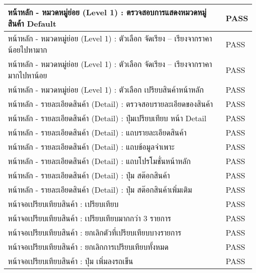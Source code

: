\begin{longtable}{|l|l|}
    \hline
    หน้าหลัก - หมวดหมู่ย่อย (Level 1) : ตรวจสอบการแสดงหมวดหมู่สินค้า Default                 & PASS             \\ 
    \hline
    หน้าหลัก - หมวดหมู่ย่อย (Level 1) : ตัวเลือก จัดเรียง – เรียงจากราคาน้อยไปหามาก          & PASS             \\ 
    \hline
    หน้าหลัก - หมวดหมู่ย่อย (Level 1) : ตัวเลือก จัดเรียง – เรียงจากราคามากไปหาน้อย          & PASS             \\ 
    \hline
    หน้าหลัก - หมวดหมู่ย่อย (Level 1) : ตัวเลือก เปรียบสินค้าหน้าหลัก                        & PASS             \\ 
    \hline
    หน้าหลัก - รายละเอียดสินค้า (Detail) : ตรวจสอบรายละเอียดของสินค้า                        & PASS             \\ 
    \hline
    หน้าหลัก - รายละเอียดสินค้า (Detail) : ปุ่มเปรียบเทียบ หน้า Detail                       & PASS             \\ 
    \hline
    หน้าหลัก - รายละเอียดสินค้า (Detail) : แถบรายละเอียดสินค้า                               & PASS             \\ 
    \hline
    หน้าหลัก - รายละเอียดสินค้า (Detail) : แถบข้อมูลจำเพาะ                                   & PASS             \\ 
    \hline
    หน้าหลัก - รายละเอียดสินค้า (Detail) : แถบโปรโมชั่นหน้าหลัก                              & PASS             \\ 
    \hline
    หน้าหลัก - รายละเอียดสินค้า (Detail) : ปุ่ม สต๊อกสินค้า                                  & PASS             \\ 
    \hline
    หน้าหลัก - รายละเอียดสินค้า (Detail) : ปุ่ม สต๊อกสินค้าเพิ่มเติม                         & PASS             \\ 
    \hline
    หน้าจอเปรียบเทียบสินค้า : เปรียบเทียบ                                                    & PASS             \\ 
    \hline
    หน้าจอเปรียบเทียบสินค้า : เปรียบเทียบมากกว่า 3 รายการ                                    & PASS             \\ 
    \hline
    หน้าจอเปรียบเทียบสินค้า : ยกเลิกตัวที่เปรียบเทียบบางรายการ                               & PASS             \\ 
    \hline
    หน้าจอเปรียบเทียบสินค้า : ยกเลิกการเปรียบเทียบทั้งหมด                                    & PASS             \\ 
    \hline
    หน้าจอเปรียบเทียบสินค้า : ปุ่ม เพิ่มลงรถเข็น                                             & PASS             \\ 

\end{longtable}
